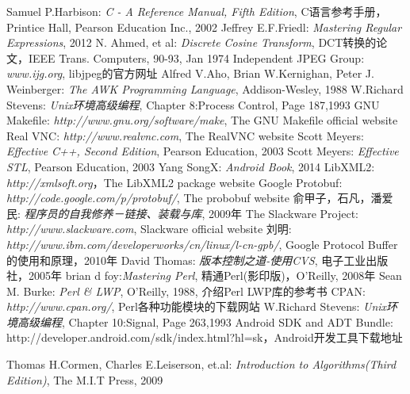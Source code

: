 \documentclass[a4paper]{book}
\begin{document}






\begin{thebibliography}{99}
 Samuel P.Harbison: {\em C - A Reference Manual, Fifth Edition}, C语言参考手册，Printice Hall, Pearson Education Inc., 2002
 Jeffrey E.F.Friedl: {\em Mastering Regular Expressions}, 2012
N. Ahmed, et al: {\em Discrete Cosine Transform}, DCT转换的论文，IEEE Trans. Computers, 90-93, Jan 1974
Independent JPEG Group: {\em www.ijg.org}, libjpeg的官方网址
 Alfred V.Aho, Brian W.Kernighan, Peter J. Weinberger: {\em The AWK Programming Language}, Addison-Wesley, 1988
 W.Richard Stevens: {\em Unix环境高级编程}, Chapter 8:Process Control, Page 187,1993
 GNU Makefile: {\em http://www.gnu.org/software/make}, The GNU Makefile official website
 Real VNC: {\em http://www.realvnc.com}, The RealVNC website
 Scott Meyers: {\em Effective C++, Second Edition}, Pearson Education, 2003
 Scott Meyers: {\em Effective STL}, Pearson Education, 2003
 Yang SongX: {\em Android Book}, 2014
 LibXML2: {\em http://xmlsoft.org}，The LibXML2 package website
 Google Protobuf: {\em http://code.google.com/p/protobuf/}, The probobuf website
 俞甲子，石凡，潘爱民: {\em 程序员的自我修养－链接、装载与库}, 2009年
 The Slackware Project: {\em http://www.slackware.com}, Slackware official website
 刘明: {\em http://www.ibm.com/developerworks/cn/linux/l-cn-gpb/}, Google Protocol Buffer 的使用和原理，2010年
 David Thomas: {\em 版本控制之道-使用CVS}, 电子工业出版社，2005年
 brian d foy:{\em Mastering Perl}, 精通Perl(影印版)，O'Reilly, 2008年
 Sean M. Burke: {\em Perl \& LWP}, O'Reilly, 1988, 介绍Perl LWP库的参考书
 CPAN: {\em http://www.cpan.org/}, Perl各种功能模块的下载网站
 W.Richard Stevens: {\em Unix环境高级编程}, Chapter 10:Signal, Page 263,1993
 Android SDK and ADT Bundle: http://developer.android.com/sdk/index.html?hl=sk，Android开发工具下载地址

Thomas H.Cormen, Charles E.Leiserson, et.al: {\em Introduction to Algorithms(Third Edition)}, The M.I.T Press, 2009


\end{thebibliography}
\end{document}
